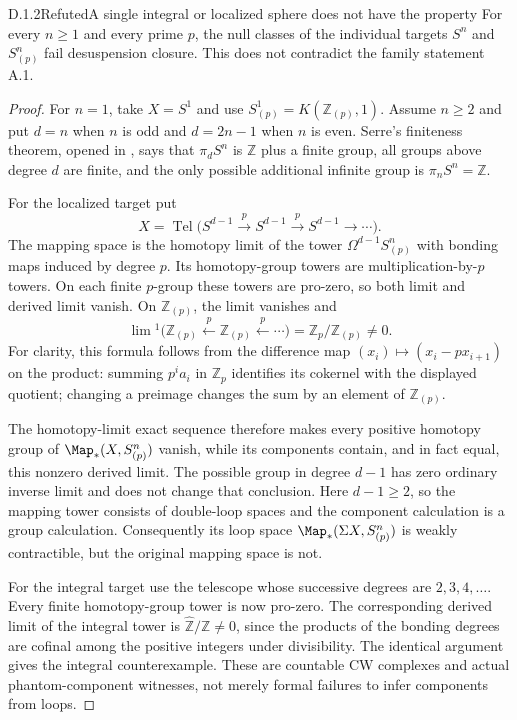 \begin{claim}{D.1.2}{Refuted}{A single integral or localized sphere does not have the property}
For every $n\geq1$ and every prime $p$, the null classes of the individual targets $S^n$ and $S^n_{(p)}$ fail desuspension closure. This does not contradict the family statement A.1.
\end{claim}
\begin{proof}
For $n=1$, take $X=S^1$ and use $S^1_{(p)}=K(\mathbb Z_{(p)},1)$. Assume $n\geq2$ and put $d=n$ when $n$ is odd and $d=2n-1$ when $n$ is even. Serre's finiteness theorem, opened in \citet[Theorem 1.21]{HatcherSS}, says that $\pi_dS^n$ is $\mathbb Z$ plus a finite group, all groups above degree $d$ are finite, and the only possible additional infinite group is $\pi_nS^n=\mathbb Z$.

For the localized target put
\[
 X=\operatorname{Tel}\bigl(S^{d-1}\xrightarrow{p}S^{d-1}
                         \xrightarrow{p}S^{d-1}\longrightarrow\cdots\bigr).
\]
The mapping space is the homotopy limit of the tower $\Omega^{d-1}S^n_{(p)}$ with bonding maps induced by degree $p$. Its homotopy-group towers are multiplication-by-$p$ towers. On each finite $p$-group these towers are pro-zero, so both limit and derived limit vanish. On $\mathbb Z_{(p)}$, the limit vanishes and
\[
 \lim{}^1\bigl(\mathbb Z_{(p)}\xleftarrow{p}\mathbb Z_{(p)}\xleftarrow{p}\cdots\bigr)
       =\mathbb Z_p/\mathbb Z_{(p)}\neq0.
\]
For clarity, this formula follows from the difference map
$(x_i)\mapsto(x_i-px_{i+1})$ on the product: summing $p^ia_i$ in $\mathbb Z_p$ identifies its cokernel with the displayed quotient; changing a preimage changes the sum by an element of $\mathbb Z_{(p)}$.

The homotopy-limit exact sequence therefore makes every positive homotopy group of $\Map_*(X,S^n_{(p)})$ vanish, while its components contain, and in fact equal, this nonzero derived limit. The possible group in degree $d-1$ has zero ordinary inverse limit and does not change that conclusion. Here $d-1\geq2$, so the mapping tower consists of double-loop spaces and the component calculation is a group calculation. Consequently its loop space $\Map_*(\Sigma X,S^n_{(p)})$ is weakly contractible, but the original mapping space is not.

For the integral target use the telescope whose successive degrees are $2,3,4,\ldots$. Every finite homotopy-group tower is now pro-zero. The corresponding derived limit of the integral tower is $\widehat{\mathbb Z}/\mathbb Z\neq0$, since the products of the bonding degrees are cofinal among the positive integers under divisibility. The identical argument gives the integral counterexample. These are countable CW complexes and actual phantom-component witnesses, not merely formal failures to infer components from loops.
\end{proof}

